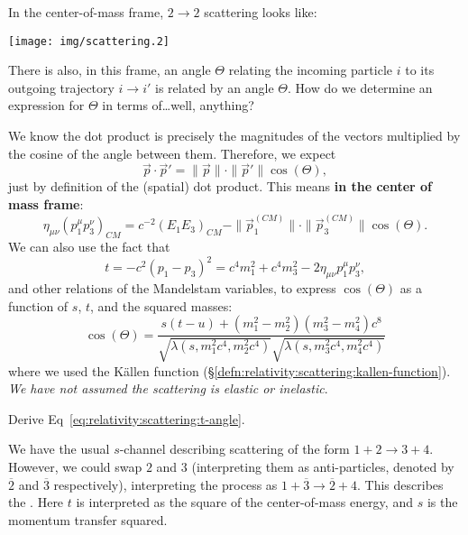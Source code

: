 \M
In the center-of-mass frame, $2\to2$ scattering looks like:
\begin{center}
\texttt{[image: img/scattering.2]}
\end{center}
There is also, in this frame, an angle $\Theta$ relating the incoming
particle $i$ to its outgoing trajectory $i\to i'$ is related by an angle
$\Theta$. How do we determine an expression for $\Theta$ in terms
of\dots well, anything?

We know the dot product is precisely the magnitudes of the vectors
multiplied by the cosine of the angle between them. Therefore, we expect
\begin{equation}
\vec{p}\cdot\vec{p}' = \|\vec{p}\|\cdot\|\vec{p}'\|\cos(\Theta),
\end{equation}
just by definition of the (spatial) dot product. This means
\textbf{in the center of mass frame}:
\begin{equation}
\eta_{\mu\nu}(p_{1}^{\mu}p_{3}^{\nu})_{CM} = c^{-2}(E_{1}E_{3})_{CM} - 
\|\vec{p}_{1}^{(CM)}\|\cdot\|\vec{p}_{3}^{(CM)}\|\cos(\Theta).
\end{equation}
We can also use the fact that
\begin{equation}
  t = -c^{2}(p_{1} - p_{3})^{2}
  = c^{4}m_{1}^{2} + c^{4}m_{3}^{2} - 2\eta_{\mu\nu}p_{1}^{\mu}p_{3}^{\nu},
\end{equation}
and other relations of the Mandelstam variables, to express
$\cos(\Theta)$ as a function of $s$, $t$, and the squared masses:
\begin{equation}\label{eq:relativity:scattering:t-angle}
\cos(\Theta) = \frac{s(t - u) + (m_{1}^{2} - m_{2}^{2})(m_{3}^{2} - m_{4}^{2})c^{8}}{\sqrt{\lambda(s,m_{1}^{2}c^{4},m_{2}^{2}c^{4})}\sqrt{\lambda(s,m_{3}^{2}c^{4},m_{4}^{2}c^{4})}}
\end{equation}
where we used the K\"{a}llen function (\S\ref{defn:relativity:scattering:kallen-function}).
\emph{We have not assumed the scattering is elastic or inelastic}.

\begin{exercise}
Derive Eq~\eqref{eq:relativity:scattering:t-angle}.
\end{exercise}

We have the usual $s$-channel describing scattering of the form $1+2\to 3+4$.
However, we could swap $2$ and $3$ (interpreting them as
anti-particles, denoted by $\overline{2}$ and $\overline{3}$
respectively), interpreting the process as
$1+\overline{3}\to\overline{2}+4$. This describes the
. Here $t$ is interpreted as the square of the
center-of-mass energy, and $s$ is the momentum transfer squared.

